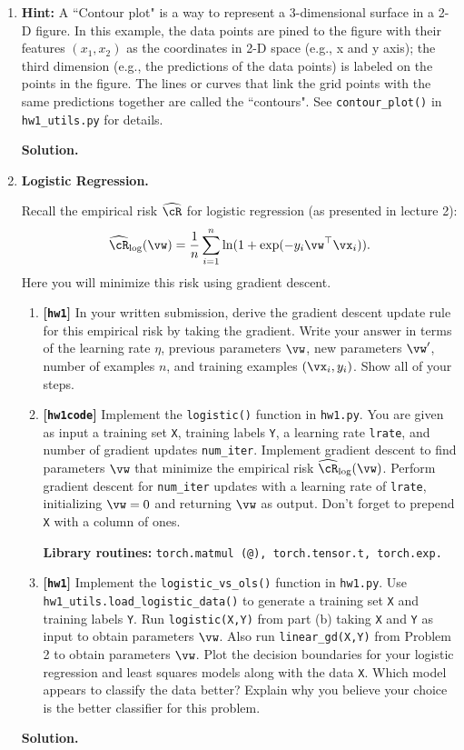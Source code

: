 \documentclass{article}
\def\hcR{\widehat{\cR}}
\def\hw{\textbf{[\texttt{hw1}]}\xspace}
\def\hwcode{\textbf{[\texttt{hw1code}]}\xspace}
\theoremstyle{definition}
\theoremstyle{remark}
\newenvironment{Q}
{%
  \clearpage
  \item
  }
  {%
    \phantom{s} %
    \bigskip
    \textbf{Solution.}
  }
\begin{document}
\begin{enumerate}[font={\Large\bfseries},left=0pt]
\begin{Q}
\begin{enumerate}
\textbf{Hint:} A ``Contour plot" is a way to represent a 3-dimensional surface in a 2-D figure. In this example, the data points are pined to the figure with their features $(x_1, x_2)$ as the coordinates in 2-D space (e.g., x and y axis); the third dimension (e.g., the predictions of the data points) is labeled on the points in the figure. The lines or curves that link the grid points with the same predictions together are called the ``contours". See \texttt{contour\_plot()} in \texttt{hw1\_utils.py} for details.
  \end{enumerate}
  \end{Q}

    \begin{Q}
  \textbf{\Large Logistic Regression.}

  Recall the empirical risk $\hcR$ for logistic regression (as presented in lecture 2):
  \begin{align*}
  \hcR_{\log}(\vw) = \frac{1}{n} \sum_{i=1}^n \ln ( 1 + \exp( - y_i \vw^\top \vx_i ) ).
  \end{align*}
  Here you will minimize this risk using gradient descent.
  \begin{enumerate}
  \item \hw In your written submission, derive the gradient descent update rule for this empirical risk by taking the gradient.  Write your answer in terms of the learning rate $\eta$, previous parameters $\vw$, new parameters $\vw'$, number of examples $n$, and training examples $(\vx_i, y_i)$.  Show all of your steps.
  \item \hwcode Implement the \texttt{logistic()} function in \texttt{hw1.py}.  You are given as input a training set \texttt{X}, training labels \texttt{Y}, a learning rate \texttt{lrate}, and number of gradient updates \texttt{num\_iter}.  Implement gradient descent to find parameters $\vw$ that minimize the empirical risk $\hcR_{\log}(\vw)$. Perform gradient descent for \texttt{num\_iter} updates with a learning rate of \texttt{lrate}, initializing $\vw = 0$ and returning $\vw$ as output. Don't forget to prepend \texttt{X} with a column of ones.
  
  \textbf{Library routines:} \texttt{torch.matmul (@), torch.tensor.t, torch.exp.}
  
  \item \hw Implement the \texttt{logistic\_vs\_ols()} function in \texttt{hw1.py}. Use \texttt{hw1\_utils.load\_logistic\_data()} to generate a training set \texttt{X} and training labels \texttt{Y}.  Run \texttt{logistic(X,Y)} from part (b) taking \texttt{X} and \texttt{Y} as input to obtain parameters $\vw$.  Also run \texttt{linear\_gd(X,Y)} from Problem 2 to obtain parameters $\vw$.  Plot the decision boundaries for your logistic regression and least squares models along with the data \texttt{X}. Which model appears to classify the data better? Explain why you believe your choice is the better classifier for this problem.
  

\end{enumerate}
\end{Q}
\end{enumerate}
\end{document}
